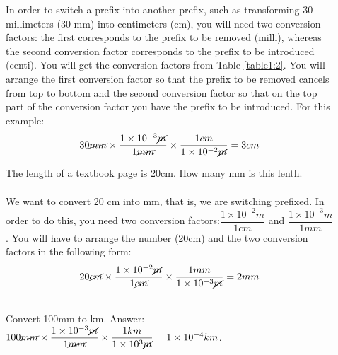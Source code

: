 \documentclass[main.tex]{subfiles}
\begin{document}
\begin{description}
\item[] In order to switch a prefix into another prefix, such as transforming 30 millimeters (30 mm) into centimeters (cm), you will need two conversion factors: the first corresponds to the prefix to be removed (milli), whereas the second conversion factor corresponds to the prefix to be introduced (centi). You will get the conversion factors from Table \ref{table1:2}. You will arrange the first conversion factor so that the prefix to be removed cancels from top to bottom and the second conversion factor so that on the top part of the conversion factor you have the prefix to be introduced. For this example:
 \begin{equation*}
30\cancel{mm} \times \dfrac{1\times10^{-3}\cancel{m}}{1\cancel{mm}}   \times \dfrac{1cm}{1\times10^{-2}\cancel{m}}       =3cm
\end{equation*}

\begin{example} %
The length of a textbook page is 20cm. How many mm is this lenth.\\
\\
 We want to convert 20 cm into mm, that is, we are switching prefixed. In order to do this, you need two conversion factors:$\dfrac{1\times10^{-2}m}{1cm}$ and $\dfrac{1\times10^{-3}m}{1mm}$. You will have to arrange the number (20cm) and the two conversion factors in the following form:
 \begin{equation*}
20\cancel{cm} \times \dfrac{1\times10^{-2}\cancel{m}}{1\cancel{cm}}   \times \dfrac{1mm}{1\times10^{-3}\cancel{m}}       =2mm
\end{equation*}

\faDiamond\ \\
Convert 100mm to km.
\flushright Answer:$100\cancel{mm} \times \dfrac{1\times10^{-3}\cancel{m}}{1\cancel{mm}}   \times \dfrac{1km}{1\times10^{3}\cancel{m}}       =1\times 10^{-4}km$.
\end{example}%



\end{description}
\end{document}
